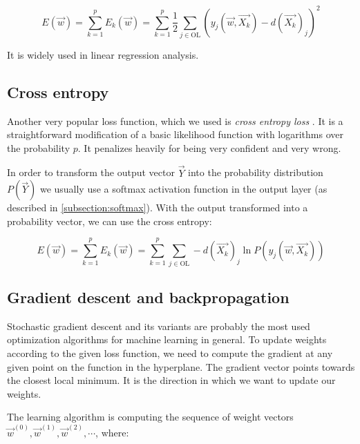 $$ E(\overrightarrow{w}) = \sum_{k=1}^{p} E_k(\overrightarrow{w}) = \sum_{k=1}^{p} \frac{1}{2} \sum_{j \in \text{OL}} (y_j(\overrightarrow{w}, \overrightarrow{X_k}) - d(\overrightarrow{X_k})_j)^2 $$

\noindent
It is widely used in linear regression analysis.

\subsection*{Cross entropy}

Another very popular loss function, which we used is \textit{cross entropy loss} \cite{cross_entropy}. It is a straightforward modification of a basic likelihood function with logarithms over the probability $p$. It penalizes heavily for being very confident and very wrong. 

In order to transform the output vector $\overrightarrow{Y}$ into the probability distribution $P(\overrightarrow{Y})$ we usually use a softmax activation function in the output layer (as described in \autoref{subsection:softmax}). With the output transformed into a probability vector, we can use the cross entropy:

$$ E(\overrightarrow{w}) =  \sum_{k=1}^{p} E_k(\overrightarrow{w}) = \sum_{k=1}^{p} \sum_{j \in \text{OL}} - d(\overrightarrow{X_k})_j \ln{P(y_j(\overrightarrow{w}, \overrightarrow{X_k}))}$$

\subsection{Gradient descent and backpropagation}

Stochastic gradient descent \cite{deep_learning_SGD} and its variants are probably the most used optimization algorithms for machine learning in general. To update weights according to the given loss function, we need to compute the gradient at any given point on the function in the hyperplane. The gradient vector points towards the closest local minimum. It is the direction in which we want to update our weights.

The learning algorithm is computing the sequence of weight vectors $\overrightarrow{w}^{(0)}, \overrightarrow{w}^{(1)}, \overrightarrow{w}^{(2)}, \cdots$, where:

